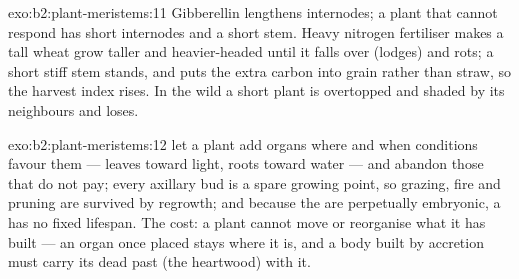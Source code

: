 \begin{solution}{exo:b2:plant-meristems:11}
Gibberellin lengthens internodes; a plant that cannot respond has
short internodes and a short stem. Heavy nitrogen fertiliser makes
a tall wheat grow taller and heavier-headed until it falls over
(lodges) and rots; a short stiff stem stands, and puts the extra
carbon into grain rather than straw, so the harvest index rises. In
the wild a short plant is overtopped and shaded by its neighbours
and loses.
\end{solution}

\begin{solution}{exo:b2:plant-meristems:12}
 let a plant add organs where and when conditions favour
them --- leaves toward light, roots toward water --- and abandon
those that do not pay; every axillary bud is a spare growing
point, so grazing, fire and pruning are survived by regrowth; and
because the  are perpetually embryonic, a  has no
fixed lifespan. The cost: a plant cannot move or reorganise what it
has built --- an organ once placed stays where it is, and a body
built by accretion must carry its dead past (the heartwood) with it.
\end{solution}

